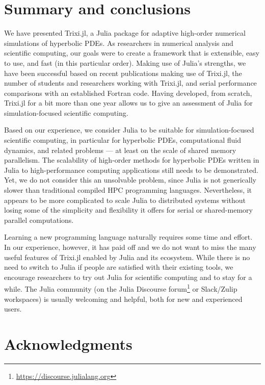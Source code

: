 \documentclass[hidelinks]{juliacon} %
\newcommand{\trixi}{Trixi.jl\xspace}
\begin{document}
\section{Summary and conclusions}
\label{sec:summary}

We have presented \trixi, a Julia package for adaptive high-order numerical
simulations of hyperbolic PDEs. As researchers in numerical analysis and
scientific computing, our goals were to create a framework that is extensible,
easy to use, and fast (in this particular order). Making use of Julia's strengths,
we have been successful based on recent publications making use of \trixi,
the number of students and researchers working with \trixi, and serial performance
comparisons with an established Fortran code. Having developed, from scratch, \trixi for a bit
more than one year allows us to give an assessment of Julia for simulation-focused
scientific computing.

Based on our experience, we consider Julia to be suitable for simulation-focused
scientific computing, in particular for hyperbolic PDEs, computational fluid
dynamics, and related problems --- at least on the scale of shared memory
parallelism. The scalability of high-order methods for hyperbolic PDEs written
in Julia to high-performance computing applications still needs to be demonstrated.
Yet, we do not consider this an unsolvable problem, since Julia is not
generically slower than traditional compiled HPC programming languages. Nevertheless,
it appears to be more complicated to scale Julia to distributed systems without losing some of the
simplicity and flexibility it offers for serial or shared-memory parallel computations.

Learning a new programming language naturally requires some time and effort.
In our experience, however, it has paid off and we do not want to miss the
many useful features of \trixi enabled by Julia and its ecosystem. While there is
no need to switch to Julia if people are satisfied with their existing
tools, we encourage researchers to try out Julia for scientific computing and to stay for a while.
The Julia
community (on the Julia Discourse forum\footnote{\url{https://discourse.julialang.org}}
or Slack/Zulip workspaces) is usually welcoming and helpful, both for new and
experienced users.



\section*{Acknowledgments}
\end{document}
